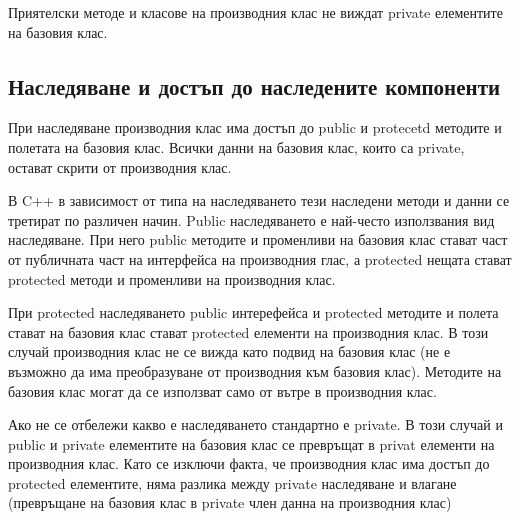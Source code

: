\documentclass[fleqn,12pt]{article}
\begin{document}
Приятелски методе и класове на производния клас не виждат private елементите на базовия клас.

\subsection{Наследяване и достъп до наследените компоненти}
При наследяване производния клас има достъп до public и protecetd методите и полетата на базовия клас. Всички данни на базовия клас, които са private, остават скрити от производния клас. 

В C++ в зависимост от типа на наследяването тези наследени методи и данни се третират по различен начин. Public наследяването е най-често използвания вид наследяване. При него public методите и променливи на базовия клас стават част от публичната част на интерфейса на производния глас, а protected нещата стават protected методи и променливи на производния клас.

При protected наследяването public интерефейса и protected методите и полета стават на базовия клас стават protected елементи на производния клас. В този случай производния клас не се вижда като подвид на базовия клас (не е възможно да има преобразуване от производния към базовия клас). Методите на базовия клас могат да се използват само от вътре в производния клас.

Ако не се отбележи какво е наследяването стандартно е private. В този случай и public и private елементите на базовия клас се превръщат в privat елементи на производния клас. Като се изключи факта, че производния клас има достъп до protected елементите, няма разлика между private наследяване и влагане (превръщане на базовия клас в private член данна на производния клас)
\end{document}
